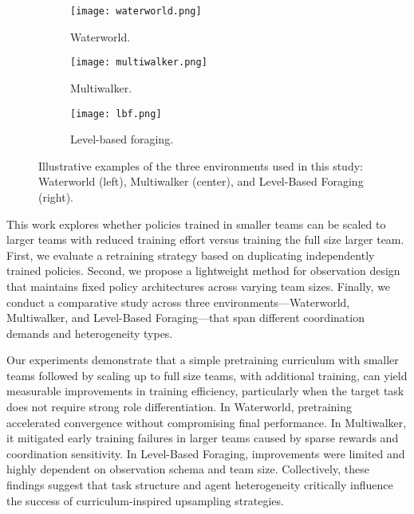 \documentclass{article}
\begin{document}
\begin{figure}[ht]
    \centering
    \begin{subfigure}{0.3\textwidth}
        \texttt{[image: waterworld.png]}
        \caption{Waterworld.}
        \label{con1:fig:waterworld}
    \end{subfigure}
    \hfil
    \begin{subfigure}{0.3\textwidth}
        \texttt{[image: multiwalker.png]}
        \caption{Multiwalker.}
        \label{con1:fig:multiwalker}
    \end{subfigure}
    \hfil
    \begin{subfigure}{0.3\textwidth}
        \texttt{[image: lbf.png]}
        \caption{Level-based foraging.}
        \label{con1:fig:lbf}
    \end{subfigure}
    \caption[Environments used in \cref{ch:contribution_1}.]%
        {Illustrative examples of the three environments used in this study: 
        Waterworld (left), Multiwalker (center), and Level-Based Foraging (right).}
    \label{con1:fig:envs-overview}
\end{figure}

This work explores whether policies trained in smaller teams can be scaled to larger teams 
with reduced training effort versus training the full size larger team. First, 
we evaluate a retraining strategy based on duplicating independently trained policies. 
Second, we propose a lightweight method for observation design that maintains fixed policy 
architectures across varying team sizes. Finally, we conduct a comparative study across 
three environments—Waterworld, Multiwalker, and Level-Based Foraging—that span different 
coordination demands and heterogeneity types.

Our experiments demonstrate that a simple pretraining curriculum with smaller teams followed by 
scaling up to full size teams, with additional training, can yield measurable improvements in 
training efficiency, particularly when the target task does not require strong role 
differentiation. 
In Waterworld, pretraining accelerated convergence without compromising final performance. 
In Multiwalker, it mitigated early training failures in larger teams caused by sparse 
rewards and coordination sensitivity. 
In Level-Based Foraging, improvements were limited and highly dependent on 
observation schema and team size. 
Collectively, these findings suggest that task structure and agent heterogeneity 
critically influence the success of curriculum-inspired upsampling strategies.
\end{document}
